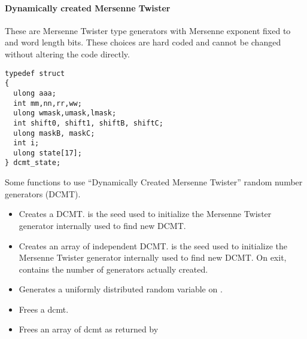 \paragraph{Dynamically created Mersenne Twister}


These are Mersenne Twister type generators with Mersenne exponent fixed to
 and word length  bits. These choices are hard coded and
cannot be changed without altering the code directly.

\begin{verbatim}
typedef struct
{
  ulong aaa;
  int mm,nn,rr,ww;
  ulong wmask,umask,lmask;
  int shift0, shift1, shiftB, shiftC;
  ulong maskB, maskC;
  int i;
  ulong state[17];
} dcmt_state;
\end{verbatim}

Some functions to use ``Dynamically Created Mersenne Twister'' random number
generators (DCMT).
\begin{itemize}
\item {}
  \sshortdescribe Creates a DCMT.  is the seed used to initialize
  the Mersenne Twister generator internally used to find new DCMT.
\item {}
  \sshortdescribe Creates an array of  independent DCMT.  is
  the seed used to initialize the Mersenne Twister generator internally used to
  find new DCMT. On exit,  contains the number of generators actually
  created.
\item {}
  \sshortdescribe Generates a uniformly distributed random variable on \var{[0,1]}.
\item {}
  \sshortdescribe Frees a dcmt.
\item {}
  \sshortdescribe Frees an array of dcmt as returned by 
\end{itemize}


